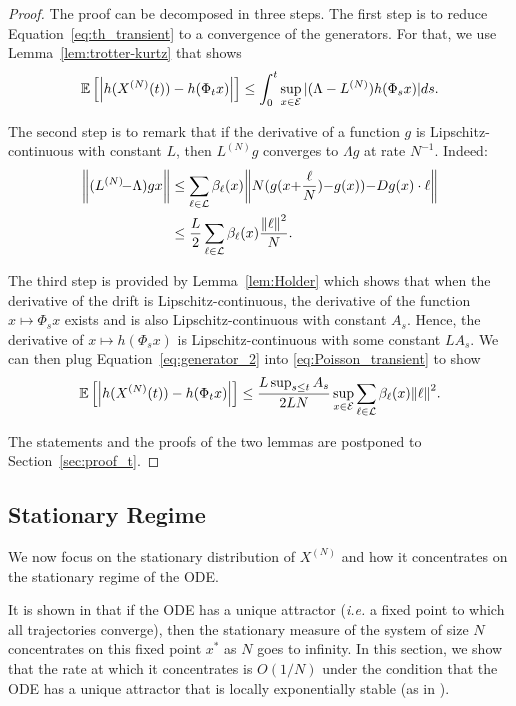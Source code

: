 \documentclass[sigconf]{acmart}
\newcommand\XN{X^{(N)}}
\newcommand\LN{L^{(N)}}
\newcommand\E{\mathcal{E}}
\newcommand\calL{\mathcal{L}}
\newcommand\esp[1]{{\mathchoice{\besp{#1}}{\sesp{#1}}{\sesp{#1}}{\sesp{#1}}}}
\newcommand\besp[1]{\mathbb{E}\left[#1\right]}
\newcommand\sesp[1]{\mathbb{E}[#1]}
\newcommand\norm[1]{{\mathchoice{\bnorm{#1}}{\snorm{#1}}{\snorm{#1}}{\snorm{#1}}}}
\newcommand\bnorm[1]{\left\|#1\right\|}
\newcommand\snorm[1]{\|#1\|}
\newcommand\abs[1]{\left|#1\right|}
\begin{document}
\begin{proof}
  The proof can be decomposed in three steps.  The first step is to
  reduce Equation~\eqref{eq:th_transient} to a convergence of the
  generators. For that, we use Lemma~\ref{lem:trotter-kurtz} that
  shows
  \begin{align}
    \esp{\abs{h(\XN(t))-h(\Phi_tx)}} \le
    \int_0^t\sup_{x\in\E}|(\Lambda-\LN)h(\Phi_sx)|ds.
    \label{eq:Poisson_transient}
  \end{align}
  
  The second step is to remark that if the derivative of a function
  $g$ is Lipschitz-continuous with constant $L$, then $\LN g$
  converges to $\Lambda g$ at rate $N^{-1}$. Indeed:
  \begin{align}
    \bigg\|(\LN\!{-}\Lambda)g x\bigg\|
    &\le \sum_{\ell\in\calL}
      \beta_\ell(x)\bigg\|N(g(x{+}\frac{\ell}{N}){-}g(x)){-}Dg(x)
      \cdot \ell \bigg\|\nonumber\\
    &\le \frac{L}{2}\sum_{\ell\in\calL} \beta_\ell(x)
      \frac{\norm{\ell}^{2}}{{N}}. 
      \label{eq:generator_2}
  \end{align}
  
  The third step is provided by Lemma~\ref{lem:Holder} which shows
  that when the derivative of the drift is Lipschitz-continuous, the
  derivative of the function $x\mapsto \Phi_s x$ exists and is also
  Lipschitz-continuous with constant $A_s$. Hence, the derivative of
  $x\mapsto h(\Phi_sx)$ is Lipschitz-continuous with some constant
  $LA_s$. We can then plug Equation~\eqref{eq:generator_2} into
  \eqref{eq:Poisson_transient} to show
  \begin{align*}
    \esp{\abs{h(\XN(t))-h(\Phi_tx)}} \le \frac{L\sup_{s\le
    t}A_s}{2LN}\sup_{x\in\E}\sum_{\ell\in\calL}\beta_\ell(x)\norm{\ell}^2.  
  \end{align*}
  
  The statements and the proofs of the two lemmas are postponed to
  Section~\ref{sec:proof_t}.
\end{proof}



\subsection{Stationary Regime}
\label{sec:steady}

We now focus on the stationary distribution of $\XN$ and how it
concentrates on the stationary regime of the ODE.

It is shown in \cite{benaim2008class} that if the ODE has a unique
attractor (\emph{i.e.} a fixed point to which all trajectories
converge), then the stationary measure of the system of size $N$
concentrates on this fixed point $x^*$ as $N$ goes to infinity.  In
this section, we show that the rate at which it concentrates is
$O(1/N)$ under the condition that the ODE has a unique attractor that
is locally exponentially stable (as in \cite{ying2016rate}).
\end{document}
